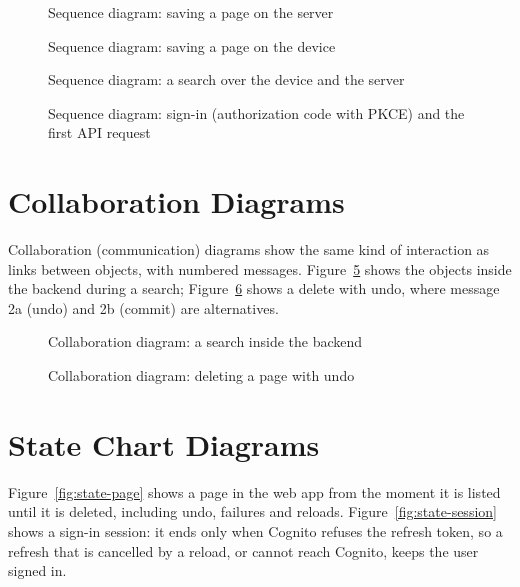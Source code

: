 \begin{figure}[H]
\centering

\caption{Sequence diagram: saving a page on the server}
\label{fig:seq-save}
\end{figure}

\begin{figure}[H]
\centering

\caption{Sequence diagram: saving a page on the device}
\label{fig:seq-save-device}
\end{figure}

\begin{figure}[H]
\centering

\caption{Sequence diagram: a search over the device and the server}
\label{fig:seq-search}
\end{figure}

\begin{figure}[H]
\centering

\caption{Sequence diagram: sign-in (authorization code with PKCE) and the first API request}
\label{fig:seq-signin}
\end{figure}

\section{Collaboration Diagrams}

Collaboration (communication) diagrams show the same kind of interaction as
links between objects, with numbered messages. Figure~\ref{fig:collab-search}
shows the objects inside the backend during a search;
Figure~\ref{fig:collab-delete} shows a delete with undo, where message 2a
(undo) and 2b (commit) are alternatives.

\begin{figure}[H]
\centering

\caption{Collaboration diagram: a search inside the backend}
\label{fig:collab-search}
\end{figure}

\begin{figure}[H]
\centering

\caption{Collaboration diagram: deleting a page with undo}
\label{fig:collab-delete}
\end{figure}

\section{State Chart Diagrams}

Figure~\ref{fig:state-page} shows a page in the web app from the moment it is
listed until it is deleted, including undo, failures and reloads.
Figure~\ref{fig:state-session} shows a sign-in session: it ends only when
Cognito refuses the refresh token, so a refresh that is cancelled by a reload,
or cannot reach Cognito, keeps the user signed in.


